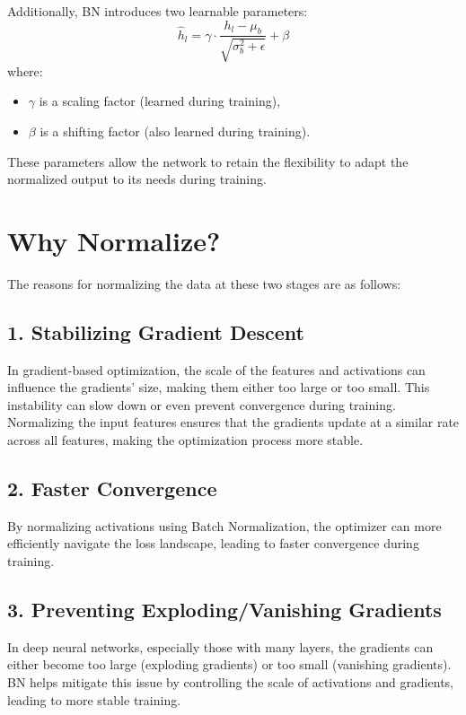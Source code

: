 \documentclass{article}
\begin{document}
Additionally, BN introduces two learnable parameters:
\[
\hat{h}_l = \gamma \cdot \frac{h_l - \mu_b}{\sqrt{\sigma_b^2 + \epsilon}} + \beta
\]
where:
\begin{itemize}
    \item \(\gamma\) is a scaling factor (learned during training),
    \item \(\beta\) is a shifting factor (also learned during training).
\end{itemize}

These parameters allow the network to retain the flexibility to adapt the normalized output to its needs during training.

\section*{Why Normalize?}
The reasons for normalizing the data at these two stages are as follows:

\subsection*{1. Stabilizing Gradient Descent}
In gradient-based optimization, the scale of the features and activations can influence the gradients' size, making them either too large or too small. This instability can slow down or even prevent convergence during training. Normalizing the input features ensures that the gradients update at a similar rate across all features, making the optimization process more stable.

\subsection*{2. Faster Convergence}
By normalizing activations using Batch Normalization, the optimizer can more efficiently navigate the loss landscape, leading to faster convergence during training.

\subsection*{3. Preventing Exploding/Vanishing Gradients}
In deep neural networks, especially those with many layers, the gradients can either become too large (exploding gradients) or too small (vanishing gradients). BN helps mitigate this issue by controlling the scale of activations and gradients, leading to more stable training.
\end{document}
